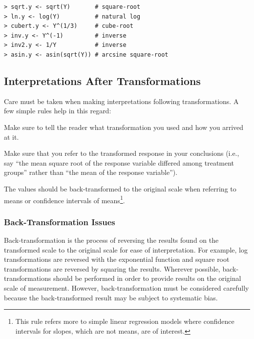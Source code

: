 \documentclass[10pt,openany]{book}\usepackage[]{graphicx}\usepackage[]{color}
\begin{document}
\begin{Verbatim}[formatcom=\color{red},xleftmargin=5mm]
> sqrt.y <- sqrt(Y)       # square-root
> ln.y <- log(Y)          # natural log
> cubert.y <- Y^(1/3)     # cube-root
> inv.y <- Y^(-1)         # inverse
> inv2.y <- 1/Y           # inverse
> asin.y <- asin(sqrt(Y)) # arcsine square-root
\end{Verbatim}


\subsection{Interpretations After Transformations} \label{sect:AOVTransformationsInterp}
Care must be taken when making interpretations following transformations.  A few simple rules help in this regard:
\begin{Enumerate}
  \item Make sure to tell the reader what transformation you used and how you arrived at it.
  \item Make sure that you refer to the transformed response in your conclusions (i.e., say ``the mean square root of the response variable differed among treatment groups'' rather than ``the mean of the response variable'').
  \item The values should be back-transformed to the original scale when referring to means or confidence intervals of means\footnote{This rule refers more to simple linear regression models where confidence intervals for slopes, which are not means, are of interest.}.
\end{Enumerate}

\subsubsection*{Back-Transformation Issues}
Back-transformation is the process of reversing the results found on the transformed scale to the original scale for ease of interpretation.  For example, log transformations are reversed with the exponential function and square root transformations are reversed by squaring the results.  Wherever possible, back-transformations should be performed in order to provide results on the original scale of measurement.  However, back-transformation must be considered carefully because the back-transformed result may be subject to systematic bias.
\end{document}
